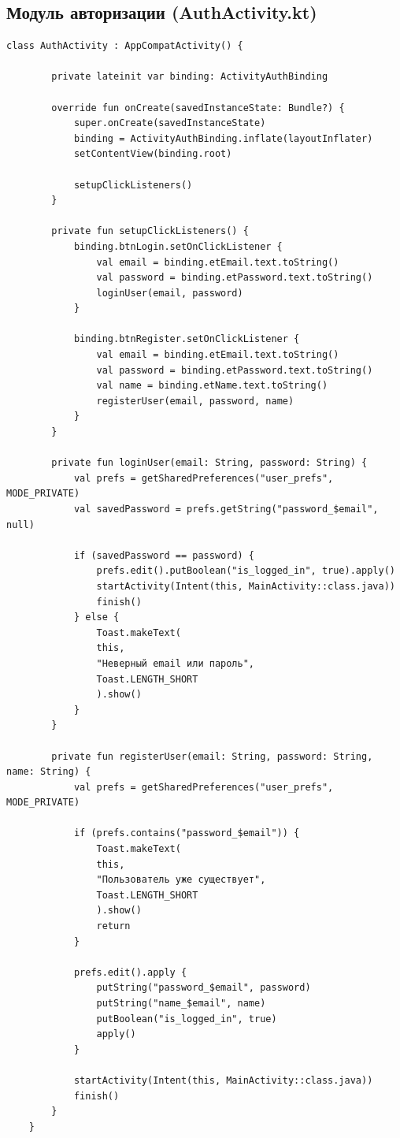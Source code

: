 
\subsection{Модуль авторизации (AuthActivity.kt)}

\begin{lstlisting}[breaklines=true]
	class AuthActivity : AppCompatActivity() {
		
		private lateinit var binding: ActivityAuthBinding
		
		override fun onCreate(savedInstanceState: Bundle?) {
			super.onCreate(savedInstanceState)
			binding = ActivityAuthBinding.inflate(layoutInflater)
			setContentView(binding.root)
			
			setupClickListeners()
		}
		
		private fun setupClickListeners() {
			binding.btnLogin.setOnClickListener {
				val email = binding.etEmail.text.toString()
				val password = binding.etPassword.text.toString()
				loginUser(email, password)
			}
			
			binding.btnRegister.setOnClickListener {
				val email = binding.etEmail.text.toString()
				val password = binding.etPassword.text.toString()
				val name = binding.etName.text.toString()
				registerUser(email, password, name)
			}
		}
		
		private fun loginUser(email: String, password: String) {
			val prefs = getSharedPreferences("user_prefs", MODE_PRIVATE)
			val savedPassword = prefs.getString("password_$email", null)
			
			if (savedPassword == password) {
				prefs.edit().putBoolean("is_logged_in", true).apply()
				startActivity(Intent(this, MainActivity::class.java))
				finish()
			} else {
				Toast.makeText(
				this, 
				"Неверный email или пароль", 
				Toast.LENGTH_SHORT
				).show()
			}
		}
		
		private fun registerUser(email: String, password: String, name: String) {
			val prefs = getSharedPreferences("user_prefs", MODE_PRIVATE)
			
			if (prefs.contains("password_$email")) {
				Toast.makeText(
				this, 
				"Пользователь уже существует", 
				Toast.LENGTH_SHORT
				).show()
				return
			}
			
			prefs.edit().apply {
				putString("password_$email", password)
				putString("name_$email", name)
				putBoolean("is_logged_in", true)
				apply()
			}
			
			startActivity(Intent(this, MainActivity::class.java))
			finish()
		}
	}
\end{lstlisting}

